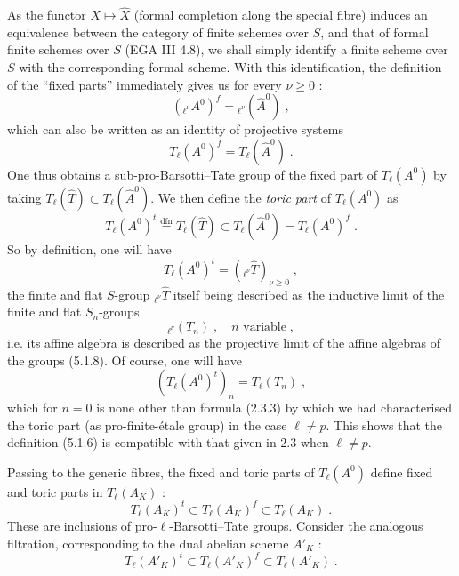 \documentclass[11pt]{article}
\theoremstyle{plain}
\theoremstyle{definition}
\theoremstyle{remark}
\newcommand{\Tl}{T_\ell}
\begin{document}
As the functor $X \mapsto \hat{X}$ (formal completion along the special
fibre) induces an equivalence between the category of finite schemes
over $S$, and that of formal finite schemes over $S$ (EGA III 4.8), we
shall simply identify a finite scheme over $S$ with the corresponding
formal scheme. With this identification, the definition of the ``fixed
parts'' immediately gives us for every $\nu \geq 0$ :
\begin{equation}
({}_{\ell^{\nu}}\!A^0)^f = {}_{\ell^{\nu}}(\hat{A}^0) \; ,
\end{equation}
which can also be written as an identity of projective systems
\begin{equation}
\Tl(A^0)^f = \Tl(\hat{A}^0) \; .
\end{equation}
One thus obtains a sub-pro-Barsotti--Tate group of the fixed part of
$\Tl(A^0)$ by taking $\Tl(\hat{T}) \subset \Tl(\hat{A}^0)$. We then
define the \emph{toric part} of $\Tl(A^0)$ as
\begin{equation}
\Tl(A^0)^t \overset{\mathrm{dfn}}{=} \Tl(\hat{T}) \subset
\Tl(\hat{A}^0) = \Tl(A^0)^f \; .
\end{equation}
So by definition, one will have
\begin{equation}
\Tl(A^0)^t = ({}_{\ell^{\nu}}\!\hat{T})_{\nu \geq 0} \; ,
\end{equation}
the finite and flat $S$-group ${}_{\ell^{\nu}}\!\hat{T}$ itself being
described as the inductive limit of the finite and flat $S_n$-groups
\begin{equation}
{}_{\ell^{\nu}}(T_n) \; , \quad n \text{ variable} \; ,
\end{equation}
i.e. its affine algebra is described as the projective limit of the
affine algebras of the groups (5.1.8). Of course, one will have
\begin{equation}
(\Tl(A^0)^t)_n = \Tl(T_n) \; ,
\end{equation}
which for $n = 0$ is none other than formula (2.3.3) by which we had
characterised the toric part (as pro-finite-\'etale group) in the case
$\ell \neq p$. This shows that the definition (5.1.6) is compatible
with that given in 2.3 when $\ell \neq p$.

\smallskip

Passing to the generic fibres, the fixed and toric parts of
$\Tl(A^0)$ define fixed and toric parts in $\Tl(A_K)$ :
\begin{equation}
\Tl(A_K)^t \subset \Tl(A_K)^f \subset \Tl(A_K) \; .
\end{equation}
These are inclusions of pro-$\ell$-Barsotti--Tate groups. Consider the
analogous filtration, corresponding to the dual abelian scheme
$A'_K$ :
\begin{equation}
\Tl(A'_K)^t \subset \Tl(A'_K)^f \subset \Tl(A'_K) \; .
\end{equation}
\end{document}
